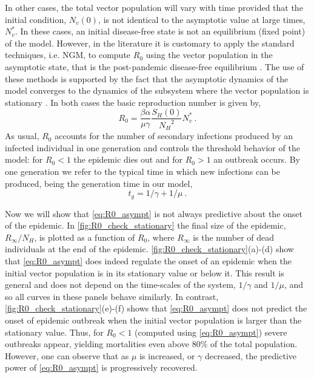 In other cases, the total vector population will vary with time provided
that the initial condition, $N_v(0)$, is not identical to the asymptotic value
at large times, $N_v^*$. In these cases, an initial disease-free state is not
an equilibrium (fixed point) of the model. However, in the literature it is
customary to apply the standard techniques, i.e. NGM, to compute $R_0$ using
the vector population in the asymptotic state, that is the post-pandemic
disease-free equilibrium \cite{Martcheva2008, Lashari2011, Shah2013, Zhao2020,
    Esteva1998}.
The use of these methods is supported by the fact that the asymptotic
dynamics of the model converges to the dynamics of the subsystem where the
vector population is stationary \cite{Thieme1992,Thieme1995}. In both cases
the basic reproduction number is given by,
\begin{equation}\label{eq:R0_asympt}
    R_0=\frac{\beta\alpha}{\mu\gamma}\frac{S_H(0)}{{N_H}^2}N_v^* \ .
\end{equation}
As usual, $R_0$ accounts for the number of secondary infections produced by
an infected individual in one generation and controls the threshold behavior of
the model: for $R_0<1$ the epidemic dies out and for $R_0>1$ an outbreak
occurs. By one generation we refer to the typical time in which new infections
can be produced, being the generation time in our model,
\begin{equation}
    t_g=1/\gamma + 1/\mu\ .
    \label{eq:generationtime}
\end{equation}

Now we will show that \cref{eq:R0_asympt} is not always predictive about the
onset of the epidemic.
In \cref{fig:R0_check_stationary} the final size of the epidemic,
$R_{\infty}/N_H$, is plotted as a function of $R_0$, where $R_\infty$ is the
number of dead individuals at the end of the epidemic.
\cref{fig:R0_check_stationary}(a)-(d) show that \cref{eq:R0_asympt} does indeed
regulate the onset of an epidemic when the initial vector population is in its
stationary value or below it. This result is general and does not depend on the
time-scales of the system, $1/\gamma$ and $1/\mu$, and so all curves in these
panels behave similarly. In contrast, \cref{fig:R0_check_stationary}(e)-(f)
shows that \cref{eq:R0_asympt} does not predict the onset of epidemic outbreak
when the initial vector population is larger than the stationary value. Thus,
for $R_0<1$ (computed using  \cref{eq:R0_asympt}) severe outbreaks appear,
yielding mortalities even above 80\% of the total population. However, one can
observe that  as $\mu$ is increased, or $\gamma$ decreased, the predictive
power of \cref{eq:R0_asympt} is progressively recovered.

